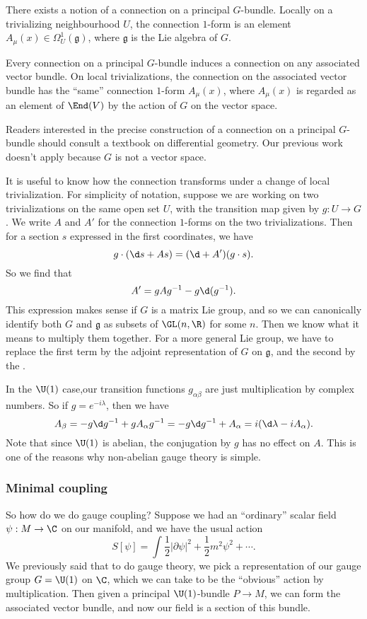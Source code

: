 \documentclass[a4paper]{article}
\begin{document}
\begin{thm}
  There exists a notion of a connection on a principal $G$-bundle. Locally on a trivializing neighbourhood $U$, the connection $1$-form is an element $A_\mu(x) \in \Omega^1_U(\mathfrak{g})$, where $\mathfrak{g}$ is the Lie algebra of $G$.

  Every connection on a principal $G$-bundle induces a connection on any associated vector bundle. On local trivializations, the connection on the associated vector bundle has the ``same'' connection $1$-form $A_\mu(x)$, where $A_\mu(x)$ is regarded as an element of $\End(V)$ by the action of $G$ on the vector space.
\end{thm}

Readers interested in the precise construction of a connection on a principal $G$-bundle should consult a textbook on differential geometry. Our previous work doesn't apply because $G$ is not a vector space.

It is useful to know how the connection transforms under a change of local trivialization. For simplicity of notation, suppose we are working on two trivializations on the same open set $U$, with the transition map given by $g: U \to G$. We write $A$ and $A'$ for the connection $1$-forms on the two trivializations. Then for a section $s$ expressed in the first coordinates, we have
\[
  g \cdot (\d s + As) = (\d + A')(g\cdot s).
\]
So we find that
\[
  A' = g A g^{-1} - g \d (g^{-1}).
\]
This expression makes sense if $G$ is a matrix Lie group, and so we can canonically identify both $G$ and $\mathfrak{g}$ as subsets of $\GL(n, \R)$ for some $n$. Then we know what it means to multiply them together. For a more general Lie group, we have to replace the first term by the adjoint representation of $G$ on $\mathfrak{g}$, and the second by the .

\begin{eg}
  In the $\U(1)$ case,our transition functions $g_{\alpha\beta}$ are just multiplication by complex numbers. So if $g = e^{-i\lambda}$, then we have
  \[
    A_{\beta} = -g \d g^{-1} + g A_\alpha g^{-1} = -g \d g^{-1} + A_\alpha = i(\d \lambda - iA_\alpha).
  \]
  Note that since $\U(1)$ is abelian, the conjugation by $g$ has no effect on $A$. This is one of the reasons why non-abelian gauge theory is simple.
\end{eg}

\subsubsection*{Minimal coupling}
So how do we do gauge coupling? Suppose we had an ``ordinary'' scalar field $\psi : M \to \C$ on our manifold, and we have the usual action
\[
  S[\psi] = \int \frac{1}{2} |\partial \psi|^2 + \frac{1}{2} m^2 \psi^2 + \cdots.
\]
We previously said that to do gauge theory, we pick a representation of our gauge group $G = \U(1)$ on $\C$, which we can take to be the ``obvious'' action by multiplication. Then given a principal $\U(1)$-bundle $P \to M$, we can form the associated vector bundle, and now our field is a section of this bundle.
\end{document}
